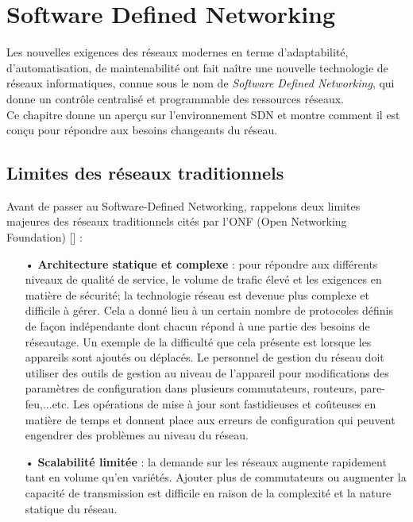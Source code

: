 \mainmatter
\chapter{Software Defined Networking} 

\label{Chapter1} 

Les nouvelles exigences des réseaux modernes en terme d’adaptabilité, d’automatisation, de maintenabilité ont fait naître une nouvelle technologie de réseaux informatiques, connue sous le nom de \textit{Software Defined Networking}, qui donne un contrôle centralisé et programmable des ressources réseaux.\\
Ce chapitre donne un aperçu sur l’environnement SDN et montre comment il est conçu  pour répondre aux besoins changeants du réseau.

\section{Limites des réseaux traditionnels}
Avant de passer au Software-Defined Networking, rappelons deux limites majeures des réseaux traditionnels cités par l'ONF (Open Networking Foundation) [\cite{1}] :\\
\begin{itemize}
\item[•] \textbf{Architecture statique et complexe} : pour répondre aux différents niveaux de qualité de service, le volume de trafic élevé et les exigences en matière de sécurité; la technologie réseau est devenue plus complexe et difficile à gérer. Cela a donné lieu à un certain nombre de protocoles définis de façon indépendante dont chacun répond à une partie des besoins de réseautage. Un exemple de la difficulté que cela présente est lorsque les appareils sont ajoutés ou déplacés. Le personnel de gestion du réseau doit utiliser des outils de gestion au niveau de l’appareil pour modifications des paramètres de configuration dans plusieurs commutateurs, routeurs, pare-feu,...etc. Les opérations de mise à jour sont fastidieuses et coûteuses en matière de temps et donnent place aux erreurs de configuration qui peuvent engendrer des problèmes au niveau du réseau.\\
\item[•] \textbf{Scalabilité limitée} : la demande sur les réseaux augmente rapidement tant en volume qu’en variétés. Ajouter plus de commutateurs ou augmenter la capacité de transmission est difficile en raison de la complexité et la nature statique du réseau.
\end{itemize}


